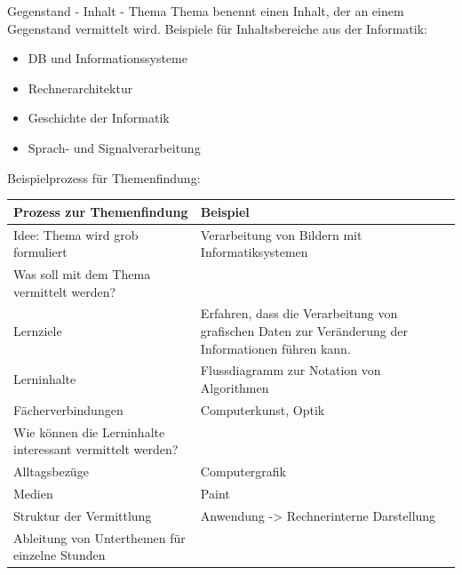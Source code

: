 \documentclass{article}
\begin{document}
\begin{block}{Gegenstand - Inhalt - Thema}
    Thema benennt einen Inhalt, der an einem Gegenstand vermittelt wird.
    Beispiele für Inhaltsbereiche aus der Informatik:
    \begin{itemize}
        \item DB und Informationssysteme
        \item Rechnerarchitektur
        \item Geschichte der Informatik
        \item Sprach- und Signalverarbeitung
    \end{itemize}
    Beispielprozess für Themenfindung:
    \begin{center}
        \begin{tabular}{|p{5cm}|p{5cm}|}
            \hline
            \textbf{Prozess zur Themenfindung} & \textbf{Beispiel} \\
            \hline
            Idee: Thema wird grob formuliert & Verarbeitung von Bildern mit Informatiksystemen \\
            \hline
            Was soll mit dem Thema vermittelt werden? & \\
            \hline
            Lernziele & Erfahren, dass die Verarbeitung von grafischen Daten zur Veränderung der Informationen führen kann. \\
            \hline
            Lerninhalte & Flussdiagramm zur Notation von Algorithmen \\
            \hline
            Fächerverbindungen & Computerkunst, Optik \\
            \hline
            Wie können die Lerninhalte interessant vermittelt werden? & \\
            \hline
            Alltagsbezüge & Computergrafik \\
            \hline
            Medien & Paint \\
            \hline
            Struktur der Vermittlung & Anwendung -> Rechnerinterne Darstellung \\
            \hline
            Ableitung von Unterthemen für einzelne Stunden & \\
            \hline
        \end{tabular}
    \end{center}
\end{block}
\end{document}
